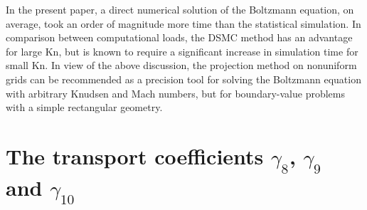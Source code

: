 \documentclass[aip,pof,preprint]{revtex4-1}
\newcommand{\Kn}{\mathrm{Kn}}
\begin{document}
In the present paper, a direct numerical solution of the Boltzmann equation, on average,
took an order of magnitude more time than the statistical simulation.
In comparison between computational loads, the DSMC method has an advantage for large \(\Kn\),
but is known to require a significant increase in simulation time for small \(\Kn\).
In view of the above discussion, the projection method on nonuniform grids can be recommended
as a precision tool for solving the Boltzmann equation with arbitrary Knudsen and Mach numbers,
but for boundary-value problems with a simple rectangular geometry.

\appendix
\section{The transport coefficients \(\gamma_8\), \(\gamma_9\) and \(\gamma_{10}\)}
\label{sec:gamma_coeffs}
\end{document}

